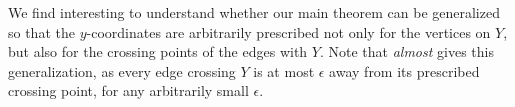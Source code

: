 \documentclass[a4paper, 11pt]{llncs}
\begin{document}
We find interesting to understand whether our main theorem can be generalized so that the $y$-coordinates are arbitrarily prescribed not only for the vertices on $Y$, but also for the crossing points of the edges with $Y$. Note that  {\em almost} gives this generalization, as every edge crossing $Y$ is at most $\epsilon$ away from its prescribed crossing point, for any arbitrarily small $\epsilon$. 

%
%

\newpage


\end{document}
